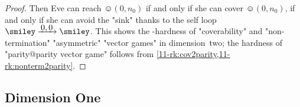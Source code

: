 \begin{proof}
  Then Eve can reach $\smiley(0,n_0)$ if and only if she can cover
  $\smiley(0,n_0)$, if and only if she can avoid the "sink" thanks to
  the self loop $\smiley\step{0,0}\smiley$.  This
  shows the \EXP-hardness of "coverability" and "non-termination"
  "asymmetric" "vector games" in dimension~two; the hardness of
  "parity@parity vector game" follows
  from \cref{11-rk:cov2parity,11-rk:nonterm2parity}.
\end{proof}

  
\subsection{Dimension One}
\label{11-sec:mono-dim1}
%
